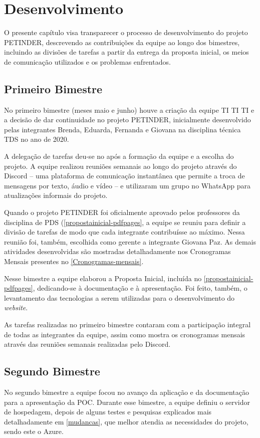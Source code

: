 \chapter{Desenvolvimento}
O presente capítulo visa transparecer o processo de desenvolvimento do projeto PETINDER, descrevendo as contribuições da equipe ao longo dos bimestres, incluindo as divisões de tarefas a partir da entrega da proposta inicial, os meios de comunicação utilizados e os problemas enfrentados. 

\section{Primeiro Bimestre}
No primeiro bimestre (meses maio e junho) houve a criação da equipe TI TI TI e a decisão de dar continuidade no projeto PETINDER, inicialmente desenvolvido pelas integrantes Brenda, Eduarda, Fernanda e Giovana na disciplina técnica \ac{TDS} no ano de 2020.  

A delegação de tarefas deu-se no após a formação da equipe e a escolha do projeto. A equipe realizou reuniões semanais ao longo do projeto através do \gls{Discord} – uma plataforma de comunicação instantânea que permite a troca de mensagens por texto, áudio e vídeo – e utilizaram um grupo no \gls{WhatsApp} para atualizações informais do projeto. 

Quando o projeto PETINDER foi oficialmente aprovado pelos professores da disciplina de \ac{PDS} (\autoref{propostainicial-pdfpages}, a equipe se reuniu para definir a divisão de tarefas de modo que cada integrante contribuísse ao máximo. Nessa reunião foi, também, escolhida como gerente a integrante Giovana Paz. As demais atividades desenvolvidas são mostradas detalhadamente nos Cronogramas Mensais presentes no \autoref{Cronogramas-mensais}.

Nesse bimestre a equipe elaborou a Proposta Inicial, incluída no  \autoref{propostainicial-pdfpages}, dedicando-se à documentação e à apresentação. Foi feito, também, o levantamento das tecnologias a serem utilizadas para o desenvolvimento do \textit{website}.

As tarefas realizadas no primeiro bimestre contaram com a participação integral de todas as integrantes da equipe, assim como mostra os cronogramas mensais através das reuniões semanais realizadas pelo \gls{Discord}. 

\section{Segundo Bimestre}
No segundo bimestre a equipe focou no avanço da aplicação e da documentação para a apresentação da \ac{POC}.
Durante esse bimestre, a equipe definiu o servidor de hospedagem, depois de alguns testes e pesquisas explicados mais detalhadamente em \autoref{mudancas}, que melhor atendia as necessidades do projeto, sendo este o \gls{Azure}.

